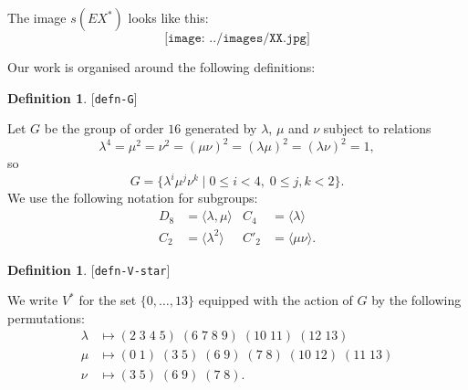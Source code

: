 \documentclass[reqno]{amsart}
\newcommand{\lbl}[1]{\label{#1}\textup{[\texttt{#1}]}\par}
\newcommand{\lbl}{\label}
\newcommand{\lm}        {\lambda}
\newcommand{\ip}[1]     {\langle #1\rangle}
\newcommand{\st}        {\;|\;}
\renewcommand{\:}{\colon}
\theoremstyle{definition}
\newtheorem{definition}[theorem]{Definition}
\begin{document}
The image $s(EX^*)$ looks like this:
\[ \texttt{[image: ../images/XX.jpg]}
\]

Our work is organised around the following
definitions:
\begin{definition}\lbl{defn-G}
 Let $G$ be the group of order $16$ generated by $\lm$, $\mu$ and
 $\nu$ subject to relations
 \[ \lm^4=\mu^2=\nu^2=(\mu\nu)^2=(\lm\mu)^2=(\lm\nu)^2=1, \]
 so
 \[ G=\{\lm^i\mu^j\nu^k\st 0\leq i<4,\;0\leq j,k<2\}. \]
 We use the following notation for subgroups:
 \begin{align*}
  D_8 &= \ip{\lm,\mu} &
  C_4 &= \ip{\lm} \\
  C_2 &= \ip{\lm^2} &
  C'_2 &= \ip{\mu\nu}.
 \end{align*}
\end{definition}

\begin{definition}\lbl{defn-V-star}
 We write $V^*$ for the set $\{0,\dotsc,13\}$ equipped with the action
 of $G$ by the following permutations:
 \begin{align*}
  \lm &\mapsto (2\;3\;4\;5)\;(6\;7\;8\;9)\;(10\;11)\;(12\;13) \\
  \mu &\mapsto (0\;1)\;(3\;5)\;(6\;9)\;(7\;8)\;(10\;12)\;(11\;13) \\
  \nu &\mapsto (3\;5)\;(6\;9)\;(7\;8).
 \end{align*}
\end{definition}
\end{document}
